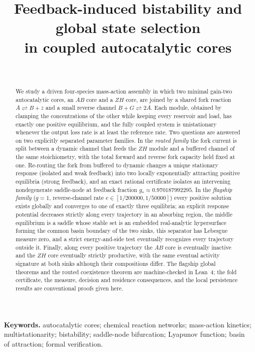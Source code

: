 \documentclass[11pt,a4paper]{article}
\title{Feedback-induced bistability and global state selection\\ in coupled autocatalytic cores}
\author{\PaperAuthor\\ \PaperAffiliation}
\date{\PaperDate}
\theoremstyle{plain}
\theoremstyle{definition}
\theoremstyle{remark}
\begin{document}
\maketitle

\begin{abstract}
We study a driven four-species mass-action assembly in which two minimal gain-two autocatalytic cores, an $AB$ core and a $ZH$ core, are joined by a shared fork reaction $A\rightleftharpoons B+z$ and a small reverse channel $B+G\rightleftharpoons 2A$. Each module, obtained by clamping the concentrations of the other while keeping every reservoir and load, has exactly one positive equilibrium, and the fully coupled system is unistationary whenever the output loss rate is at least the reference rate. Two questions are answered on two explicitly separated parameter families. In the \emph{routed family} the fork current is split between a dynamic channel that feeds the $ZH$ module and a buffered channel of the same stoichiometry, with the total forward and reverse fork capacity held fixed at one. Re-routing the fork from buffered to dynamic changes a unique stationary response (isolated and weak feedback) into two locally exponentially attracting positive equilibria (strong feedback), and an exact rational certificate isolates an intervening nondegenerate saddle-node at feedback fraction $g_*\approx0.970187992295$. In the \emph{flagship family} ($g=1$, reverse-channel rate $e\in[1/200000,1/50000]$) every positive solution exists globally and converges to one of exactly three equilibria; an explicit response potential decreases strictly along every trajectory in an absorbing region, the middle equilibrium is a saddle whose stable set is an embedded real-analytic hypersurface forming the common basin boundary of the two sinks, this separator has Lebesgue measure zero, and a strict energy-and-side test eventually recognizes every trajectory outside it. Finally, along every positive trajectory the $AB$ core is eventually inactive and the $ZH$ core eventually strictly productive, with the same eventual activity signature at both sinks although their compositions differ. The flagship global theorems and the routed coexistence theorem are machine-checked in Lean~4; the fold certificate, the measure, decision and residence consequences, and the local persistence results are conventional proofs given here.
\end{abstract}

\noindent\textbf{Keywords.} autocatalytic cores; chemical reaction networks; mass-action kinetics; multistationarity; bistability; saddle-node bifurcation; Lyapunov function; basin of attraction; formal verification.
\end{document}
